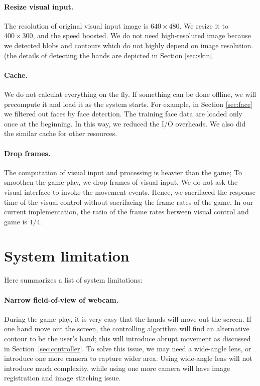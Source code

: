 \documentclass[10pt,twocolumn,letterpaper]{article}
\begin{document}
\paragraph{Resize visual input.} The resolution of 
original visual input image is $640 \times 480$. 
We resize it to $400 \times 300$, and the speed boosted.
We do not need high-resoluted image because we detected 
blobs and contours which do not highly depend on image resolution. 
(the details of detecting the hands are depicted in Section 
\ref{sec:skin}.

\paragraph{Cache.} We do not calculat everything on the fly. 
If something can be done offline, we will precompute it and 
load it as the system starts. For example, in Section 
\ref{sec:face} we filtered out faces by face detection. 
The training face data are loaded only once at the beginning. 
In this way, we reduced the I/O overheads. We also did the 
similar cache for other resources.

\paragraph{Drop frames.} The computation of visual input 
and processing is heavier than the game; To smoothen the game 
play, we drop frames of visual input. We do not ask 
the visual interface to invoke the movement events. 
Hence, we sacrifaced the response time of the visual control 
without sacrifacing the frame rates of the game. In our 
current implementation, the ratio of the frame rates between 
visual control and game is $1/4$.


\section{System limitation}
Here summarizes a list of system limitations:

\paragraph{Narrow field-of-view of webcam.} 
During the game play, it is very easy that the hands will move out 
the screen. If one hand move out the screen, 
the controlling algorithm will find an alternative contour 
to be the user's hand; this will introduce abrupt movement 
as discussed in Section~\ref{sec:controller}. 
To solve this issue, we may need a wide-angle lens, or 
introduce one more camera to capture wider area. 
Using wide-angle lens will not introduce much 
complexity, while using one more camera will have image registration 
and image stitching issue. 
\end{document}
